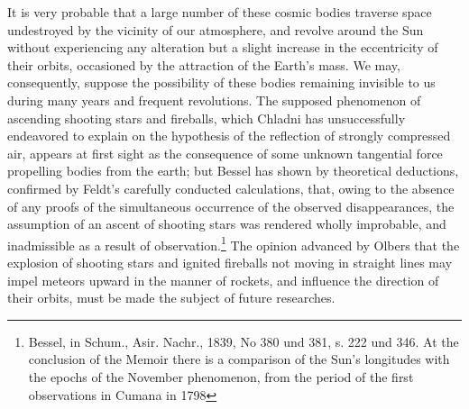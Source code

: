 It is very probable that a large number of these cosmic bodies traverse space undestroyed by the vicinity of our atmosphere, and revolve around the Sun without experiencing any alteration but a slight increase in the eccentricity of their orbits, occasioned by the attraction of the Earth's mass. We may, consequently, suppose the possibility of these bodies remaining invisible to us during many years and frequent revolutions. The supposed phenomenon of ascending shooting stars and fireballs, which Chladni has unsuccessfully endeavored to explain on the hypothesis of the reflection of strongly compressed air, appears at first sight as the consequence of some unknown tangential force propelling bodies from the earth; but Bessel has shown by theoretical deductions, confirmed by Feldt's carefully conducted calculations, that, owing to the absence of any proofs of the simultaneous occurrence of the observed disappearances, the assumption of an ascent of shooting stars was rendered wholly improbable, and inadmissible as a result of observation.\footnote{Bessel, in Schum., Asir. Nachr., 1839, No 380 und 381, s. 222 und 346. At the conclusion of the Memoir there is a comparison of the Sun's longitudes with the epochs of the November phenomenon, from the period of the first observations in Cumana in 1798} The opinion advanced by Olbers that the explosion of shooting stars and ignited fireballs not moving in straight lines may impel meteors upward in the manner of rockets, and influence the direction of their orbits, must be made the subject of future researches.

